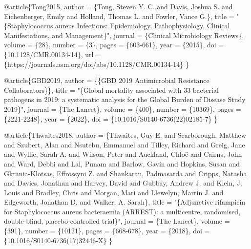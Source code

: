 \documentclass[
  letterpaper,
  DIV=11,
  numbers=noendperiod]{scrartcl}
\newenvironment{Shaded}{\begin{snugshade}}{\end{snugshade}}
\newcommand{\DataTypeTok}[1]{\textcolor[rgb]{0.68,0.00,0.00}{#1}}
\newcommand{\NormalTok}[1]{\textcolor[rgb]{0.00,0.23,0.31}{#1}}
\newcommand{\OtherTok}[1]{\textcolor[rgb]{0.00,0.23,0.31}{#1}}
\newcommand{\StringTok}[1]{\textcolor[rgb]{0.13,0.47,0.30}{#1}}
\newcommand{\VariableTok}[1]{\textcolor[rgb]{0.07,0.07,0.07}{#1}}
\begin{document}
\begin{Shaded}
\begin{Highlighting}[]
\VariableTok{@article}\NormalTok{\{}\OtherTok{Tong2015}\NormalTok{,}
    \DataTypeTok{author}\NormalTok{ = \{Tong, Steven Y. C. and Davis, Joshua S. and Eichenberger, Emily and Holland, Thomas L. and Fowler, Vance G.\},}
    \DataTypeTok{title}\NormalTok{ = "}\StringTok{\{Staphylococcus aureus Infections: Epidemiology, Pathophysiology, Clinical Manifestations, and Management\}}\NormalTok{",}
    \DataTypeTok{journal}\NormalTok{ = \{Clinical Microbiology Reviews\},}
    \DataTypeTok{volume}\NormalTok{ = \{28\},}
    \DataTypeTok{number}\NormalTok{ = \{3\},}
    \DataTypeTok{pages}\NormalTok{ = \{603{-}661\},}
    \DataTypeTok{year}\NormalTok{ = \{2015\},}
    \DataTypeTok{doi}\NormalTok{ = \{10.1128/CMR.00134{-}14\},}
    \DataTypeTok{url}\NormalTok{ = \{https://journals.asm.org/doi/abs/10.1128/CMR.00134{-}14\}}
\NormalTok{\}}

\VariableTok{@article}\NormalTok{\{}\OtherTok{GBD2019}\NormalTok{,}
    \DataTypeTok{author}\NormalTok{ = \{\{GBD 2019 Antimicrobial Resistance Collaborators\}\},}
    \DataTypeTok{title}\NormalTok{ = "}\StringTok{\{Global mortality associated with 33 bacterial pathogens in 2019: a systematic analysis for the Global Burden of Disease Study 2019\}}\NormalTok{",}
    \DataTypeTok{journal}\NormalTok{ = \{The Lancet\},}
    \DataTypeTok{volume}\NormalTok{ = \{400\},}
    \DataTypeTok{number}\NormalTok{ = \{10369\},}
    \DataTypeTok{pages}\NormalTok{ = \{2221{-}2248\},}
    \DataTypeTok{year}\NormalTok{ = \{2022\},}
    \DataTypeTok{doi}\NormalTok{ = \{10.1016/S0140{-}6736(22)02185{-}7\}}
\NormalTok{\}}

\VariableTok{@article}\NormalTok{\{}\OtherTok{Thwaites2018}\NormalTok{,}
    \DataTypeTok{author}\NormalTok{ = \{Thwaites, Guy E. and Scarborough, Matthew and Szubert, Alan and Nsutebu, Emmanuel and Tilley, Richard and Greig, Jane and Wyllie, Sarah A. and Wilson, Peter and Auckland, Chloë and Cairns, John and Ward, Debbi and Lal, Punam and Barlow, Gavin and Hopkins, Susan and Gkrania{-}Klotsas, Effrossyni Z. and Shankaran, Padmasarda and Cripps, Natasha and Davies, Jonathan and Harvey, David and Gubbay, Andrew J. and Klein, J. Louis and Bradley, Chris and Morgan, Mari and Llewelyn, Martin J. and Edgeworth, Jonathan D. and Walker, A. Sarah\},}
    \DataTypeTok{title}\NormalTok{ = "}\StringTok{\{Adjunctive rifampicin for Staphylococcus aureus bacteraemia (ARREST): a multicentre, randomised, double{-}blind, placebo{-}controlled trial\}}\NormalTok{",}
    \DataTypeTok{journal}\NormalTok{ = \{The Lancet\},}
    \DataTypeTok{volume}\NormalTok{ = \{391\},}
    \DataTypeTok{number}\NormalTok{ = \{10121\},}
    \DataTypeTok{pages}\NormalTok{ = \{668{-}678\},}
    \DataTypeTok{year}\NormalTok{ = \{2018\},}
    \DataTypeTok{doi}\NormalTok{ = \{10.1016/S0140{-}6736(17)32446{-}X\}}
\NormalTok{\}}


\end{Highlighting}
\end{Shaded}
\end{document}
